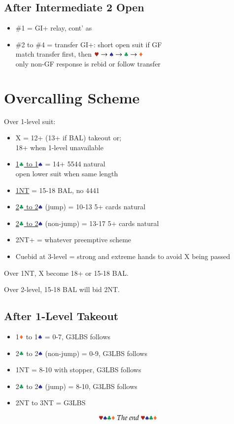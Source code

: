 \documentclass{article}
\begin{document}
\begin{multicols}{2}
\begin{CJK*}{UTF8}{gt}
\subsection{After Intermediate 2 Open}\label{sec:intermediate-2}
\begin{itemize}
    \item \#1 = GI+ relay, cont' as 
    \item \#2 to \#4 = transfer GI+: short open suit if GF \\
        match transfer first, then $\hscd$ \\
        only non-GF response is rebid or follow transfer
        
\end{itemize}

\section{Overcalling Scheme}
Over 1-level suit:
\begin{itemize}
    \item X = 12+ (13+ if BAL) takeout or; \\
        18+ when 1-level unavailable
    \item \hyperref[sec:strong-1]{1$\ccc$ to 1$\sss$} = 14+ 5544 natural \\
        open lower suit when same length
    \item \hyperref[sec:1n]{1NT} = 15-18 BAL, no 4441
    \item \hyperref[sec:intermediate-2]{2$\ccc$ to 2$\sss$} (jump) = 10-13 5+ cards natural
    \item \hyperref[sec:intermediate-2]{2$\ccc$ to 2$\sss$} (non-jump) = 13-17 5+ cards natural
    \item 2NT+ = whatever preemptive scheme
    \item Cuebid at 3-level = strong and extreme hands to avoid X being passed
\end{itemize}

\noindent Over 1NT, X become 18+ or 15-18 BAL.

\noindent Over 2-level, 15-18 BAL will bid 2NT.

\subsection{After 1-Level Takeout}
\begin{itemize}
    \item 1$\ddd$ to 1$\sss$ = 0-7, G3LBS follows
    \item 2$\ccc$ to 2$\sss$ (non-jump) = 0-9, G3LBS follows
    \item 1NT = 8-10 with stopper, G3LBS follows
    \item 2$\ccc$ to 2$\sss$ (jump) = 8-10, G3LBS follows
    \item 2NT to 3NT = G3LBS
\end{itemize}

\columnbreak
$$\hhh\sss\ccc\ddd~The~end~\hhh\sss\ccc\ddd$$

\end{CJK*}
\end{multicols}
\end{document}
